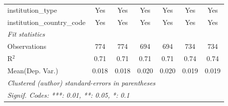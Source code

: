 \begin{tabular}{lcccccc}
   institution\_type                  & Yes     & Yes     & Yes     & Yes     & Yes       & Yes\\  
   institution\_country\_code         & Yes     & Yes     & Yes     & Yes     & Yes       & Yes\\  
   \midrule
   \emph{Fit statistics}\\
   Observations                       & 774     & 774     & 694     & 694     & 734       & 734\\  
   R$^2$                              & 0.71    & 0.71    & 0.71    & 0.71    & 0.74      & 0.74\\  
Mean(Dep. Var.) & 0.018 & 0.018 & 0.020 & 0.020 & 0.019 & 0.019 \\
   \midrule \midrule
   \multicolumn{7}{l}{\emph{Clustered (author) standard-errors in parentheses}}\\
   \multicolumn{7}{l}{\emph{Signif. Codes: ***: 0.01, **: 0.05, *: 0.1}}\\
\end{tabular}
\par\endgroup
